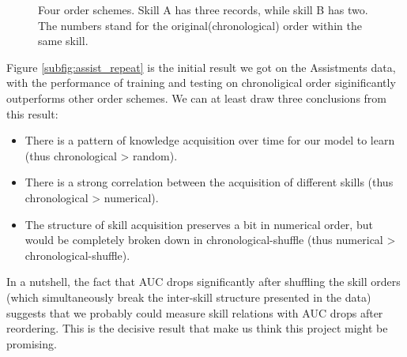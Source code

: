 \begin{figure}
\hspace{0.1\linewidth}
\newline
{}
\hspace{0.1\linewidth}
\caption{Four order schemes. Skill A has three records, while skill B has two. The numbers stand for the original(chronological) order within the same skill.}
\label{fig:4order}
\end{figure}

Figure \ref{subfig:assist_repeat} is the initial result we got on the Assistments data, with the performance of training and testing on chronoligical order siginificantly outperforms other order schemes. We can at least draw three conclusions from this result:

\begin{itemize}
\item There is a pattern of knowledge acquisition over time for our model to learn (thus chronological > random). 
\item There is a strong correlation between the acquisition of different skills (thus chronological > numerical).
\item The structure of skill acquisition preserves a bit in numerical order, but would be completely broken down in chronological-shuffle (thus numerical > chronological-shuffle).
\end{itemize}

In a nutshell, the fact that AUC drops significantly after shuffling the skill orders (which simultaneously break the inter-skill structure presented in the data) suggests that we probably could measure skill relations with AUC drops after reordering. This is the decisive result that make us think this project might be promising.

